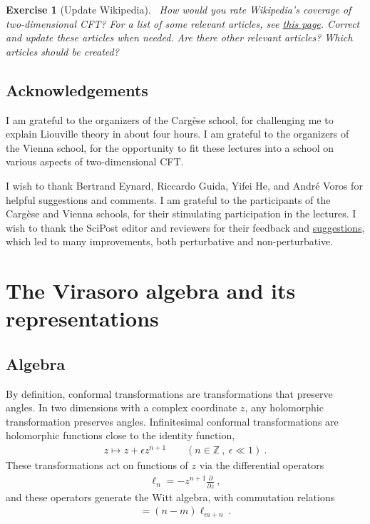 \documentclass[12pt, a4paper]{article}
\theoremstyle{break}
\newtheorem{exo}{Exercise}[section]
\begin{document}
\begin{exo}[Update Wikipedia]
 ~\label{exo:wiki}
 How would you rate Wikipedia's coverage of two-dimensional CFT? For a list of some relevant articles, see 
 \href{https://en.wikipedia.org/wiki/User:Sylvain_Ribault/YRIS2019}{this page}.
 Correct and update these articles when needed. Are there other relevant articles? Which articles should be created?
\end{exo}

\subsection*{Acknowledgements}

I am grateful to the organizers of the Carg\`ese school, for challenging me to explain Liouville theory in about four hours. I am grateful to the organizers of the Vienna school, for the opportunity to fit these lectures into a school on various aspects of two-dimensional CFT. 

I wish to thank Bertrand Eynard, Riccardo Guida, Yifei He, and Andr\'e Voros for helpful suggestions and comments.
I am grateful to the participants of the Carg\`ese and Vienna schools, for their stimulating participation in the lectures.
I wish to thank the SciPost editor and reviewers for their feedback and \href{https://scipost.org/submission/1609.09523v2/}{suggestions}, which led to many improvements, both perturbative and non-perturbative.



\section{The Virasoro algebra and its representations}

\subsection{Algebra}

By definition, conformal transformations are transformations that preserve angles. 
In two dimensions with a complex coordinate $z$, any holomorphic transformation preserves angles.
Infinitesimal conformal transformations are holomorphic functions close to the identity function, 
\begin{align}
 z \mapsto z + \epsilon z^{n+1}\qquad (n\in\mathbb{Z}\ , \ \epsilon\ll 1) \ .
\end{align}
These transformations act on functions of $z$ via the differential operators 
\begin{align}
 \ell_n = -z^{n+1}\frac{\partial}{\partial z}\ ,
\end{align}
and these operators generate the Witt algebra, with commutation relations
\begin{align}
 [\ell_n,\ell_m ] = (n-m)\ell_{m+n}\ .
\end{align}
\end{document}
